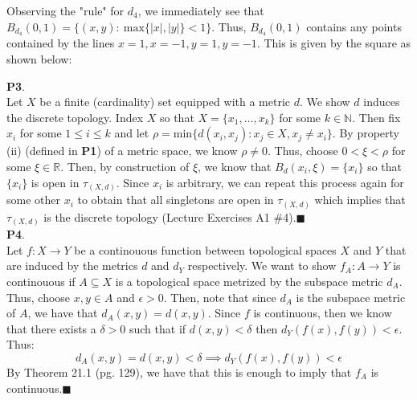 \documentclass{article}
\begin{document}
    Observing the "rule" for $d_4$, we immediately see that $B_{d_4}(0,1) = \{(x,y):\:\text{max}\{|x|,|y|\}<1\}$. Thus, $B_{d_4}(0,1)$ contains
    any points contained by the lines $x=1,x=-1,y=1,y=-1$. This is given by the square as shown below:
    \begin{center}
    \end{center}

    \textbf{P3}.\\
    Let $X$ be a finite (cardinality) set equipped with a metric $d$. We show $d$ induces the discrete topology. Index $X$ so that $X = \{x_1,\hdots,x_k\}$ for
    some $k\in\mathbb{N}$. Then fix $x_i$ for some $1\leq i\leq k$ and let $\rho = $min$\{d(x_i,x_j): x_j\in X, x_j\neq x_i\}$. By property (ii) (defined in 
    \textbf{P1}) of a metric space, we know $\rho\neq 0$. Thus, choose $0<\xi<\rho$ for some $\xi\in\mathbb{R}$. Then, by construction of $\xi$, we 
    know that $B_{d}(x_i,\xi) = \{x_i\}$ so that $\{x_i\}$ is open in $\tau_{(X,d)}$. 
    Since $x_i$ is arbitrary, we can repeat this process again for some other $x_i$ to obtain that all singletons are open 
    in $\tau_{(X,d)}$ which implies that $\tau_{(X,d)}$ is the discrete topology (Lecture Exercises A1 \#4).\hfill$\blacksquare$\\

    \textbf{P4}.\\
    Let $f: X \to Y$ be a continouous function between topological spaces $X$ and $Y$ that are induced by the metrics $d$ and $d_Y$ respectively. We want to show
    $f_A: A \to Y$ is continouous if $A\subseteq X$ is a topological space metrized by the subspace metric $d_A$. Thus, choose $x,y\in A$ and $\epsilon > 0$. Then,
    note that since $d_A$ is the subspace metric of $A$, we have that $d_A(x,y) = d(x,y)$. Since $f$ is continuous, then we know that there exists a $\delta>0$ such
    that if $d(x,y)<\delta$ then $d_Y(f(x),f(y))<\epsilon$. Thus:
    \[ d_A(x,y) = d(x,y) < \delta \implies d_Y(f(x),f(y))<\epsilon \]
    By Theorem 21.1 (pg. 129), we have that this is enough to imply that $f_A$ is continuous.\hfill$\blacksquare$\\
\end{document}
